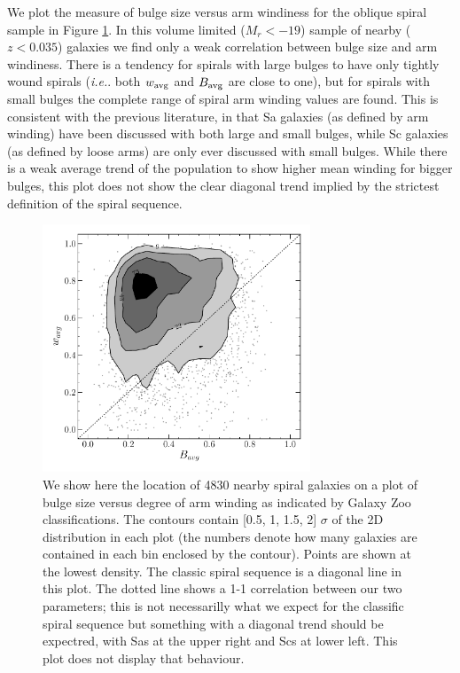 \documentclass[usenatbib]{mn2e}
\newcommand{\ie}{{\it i.e.}}
\begin{document}
 We plot the measure of bulge size versus arm windiness for the oblique spiral sample in Figure \ref{bulgewinding}. In this volume limited ($M_r<-19$) sample of nearby ($z<0.035$) galaxies we find only a weak correlation between bulge size and arm windiness. There is a tendency for spirals with large bulges to have only tightly wound spirals (\ie. both $w_{\rm avg}$ and $B_{\rm avg}$ are close to one), but for spirals with small bulges the complete range of spiral arm winding values are found.  This is consistent with the previous literature, in that Sa galaxies (as defined by arm winding) have been discussed with both large and small bulges, while Sc galaxies (as defined by loose arms) are only ever discussed with small bulges. While there is a weak average trend of the population to show higher mean winding for bigger bulges, this plot does not show the clear diagonal trend implied by the strictest definition of the spiral sequence. 
 
 \begin{figure}
\includegraphics[width=80mm]{bulge_armwinding.pdf}
\caption{We show here the location of {4830} nearby spiral galaxies on a plot of bulge size versus degree of arm winding as indicated by Galaxy Zoo classifications. The contours contain [0.5, 1, 1.5, 2] $\sigma$ of the 2D distribution in each plot (the numbers denote how many galaxies are contained in each bin enclosed by the contour). Points are shown at the lowest density.  The classic spiral sequence is a diagonal line in this plot. The dotted line shows a 1-1 correlation between our two parameters; this is not necessarilly what we expect for the classific spiral sequence but something with a diagonal trend should be expectred, with Sas at the upper right and Scs at lower left. This plot does not display that behaviour.  \label{bulgewinding}}
\end{figure}
 
\end{document}
